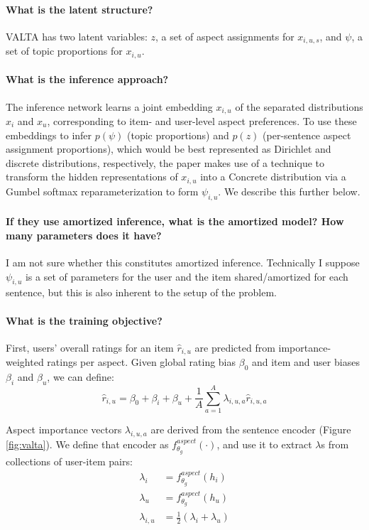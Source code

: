 \documentclass[11pt]{article}
\begin{document}
\paragraph{What is the latent structure?} VALTA has two latent variables: $z$, a set of aspect assignments for $x_{i,u,s}$, and $\psi$, a set of topic proportions for $x_{i,u}$.

\paragraph{What is the inference approach?} The inference network learns a joint embedding $x_{i,u}$ of the separated distributions $x_i$ and $x_u$, corresponding to item- and user-level aspect preferences. To use these embeddings to infer $p(\psi)$ (topic proportions) and $p(z)$ (per-sentence aspect assignment proportions), which would be best represented as Dirichlet and discrete distributions, respectively, the paper makes use of a technique to transform the hidden representations of $x_{i,u}$ into a Concrete distribution via a Gumbel softmax reparameterization to form $\psi_{i,u}$. We describe this further below.

\paragraph{If they use amortized inference, what is the amortized model? How many parameters does it have?} I am not sure whether this constitutes amortized inference. Technically I suppose $\psi_{i,u}$ is a set of parameters for the user and the item shared/amortized for each sentence, but this is also inherent to the setup of the problem.

\paragraph{What is the training objective?} First, users' overall ratings for an item $\hat{r}_{i,u}$ are predicted from importance-weighted ratings per aspect. Given global rating bias $\beta_0$ and item and user biases $\beta_i$ and $\beta_u$, we can define:
$$\hat{r}_{i,u} = \beta_0 + \beta_i + \beta_u + \frac{1}{A} \sum_{a=1}^A \lambda_{i,u,a} \hat{r}_{i,u,a}$$

Aspect importance vectors $\lambda_{i,u,a}$ are derived from the sentence encoder (Figure \ref{fig:valta}). We define that encoder as $f_{\theta_{g}}^{aspect}(\cdot)$, and use it to extract $\lambda$s from collections of user-item pairs:
\begin{align*}
  \lambda_i &= f_{\theta_{g}}^{aspect} (h_i) \\ \lambda_u &= f_{\theta_{g}}^{aspect} (h_u) \\
  \lambda_{i,u} &= \frac{1}{2}(\lambda_i+\lambda_u)
\end{align*}
\end{document}
